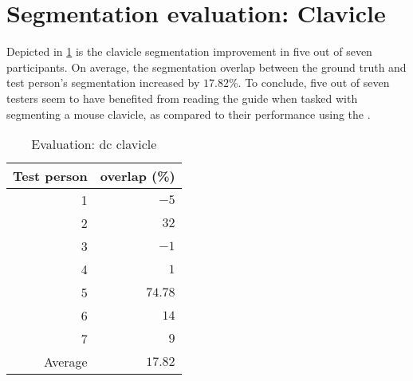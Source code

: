 \section{Segmentation evaluation: Clavicle}\label{s:seg-eval-clavicle}
Depicted in \cref{tab:clavicle-overlap} is the clavicle segmentation improvement in five out of seven participants.
On average, the segmentation overlap between the ground truth and test person's segmentation increased by $17.82\%$.
To conclude, five out of seven testers seem to have benefited from reading the guide when tasked with segmenting a mouse
clavicle, as compared to their performance using the .
\begin{table}[ht]
	\begin{center}
		\begin{tabular}{r r}
			\textbf{Test person} & \textbf{overlap (\%)} \\
			\hline
			1                    & $-5$                  \\
			2                    & $32$                  \\
			3                    & $-1$                  \\
			4                    & $1$                   \\
			5                    & $74.78$               \\
			6                    & $14$                  \\
			7                    & $9$                   \\
			\hline
			Average              & $17.82$               \\
		\end{tabular}
		\caption{Evaluation: \acrshort{dc} clavicle}\label{tab:clavicle-overlap}
	\end{center}
\end{table}

